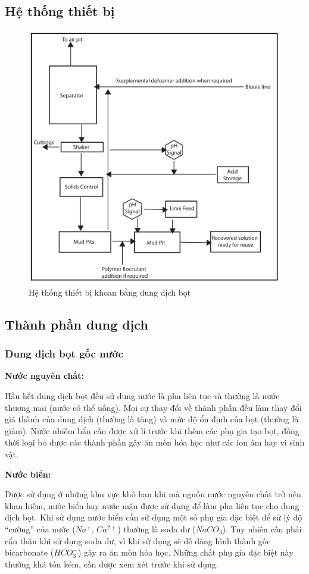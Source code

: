 \documentclass[13pt,a4paper]{article}
\begin{document}
\subsection{Hệ thống thiết bị}
	\begin{figure}[h]
	\centering
	\includegraphics[scale=0.4]{Figs/Fig5.png}
	\caption{Hệ thống thiết bị khoan bằng dung dịch bọt}
	\end{figure}
\subsection{Thành phần dung dịch}
	\subsubsection{Dung dịch bọt gốc nước}
	\textbf{Nước nguyên chất:}\par
	Hầu hết dung dịch bọt đều sử dụng nước là pha liên tục và thường là nước thương mại (nước có thể uống). Mọi sự thay đổi về thành phần đều làm thay đổi giá thành của dung dịch (thường là tăng) và mức độ ổn định của bọt (thường là giảm). Nước nhiễm bẩn cần được xử lí trước khi thêm các phụ gia tạo bọt, đồng thời loại bỏ được các thành phần gây ăn mòn hóa học như các ion âm hay vi sinh vật.\par
	\textbf{Nước biển:}\par
	Được sử dụng ở những khu vực khô hạn khi mà nguồn nước nguyên chất trở nên khan hiếm, nước biển hay nước mặn được sử dụng để làm pha liên tục cho dung dịch bọt. Khi sử dụng nước biển cần sử dụng một số phụ gia đặc biệt để sử lý độ “cường” của nước ($Na^+$, $Ca^{2+}$) thường là soda dư ($NaCO_3$). Tuy nhiên cần phải cẩn thận khi sử dụng soda dư, vì khi sử dụng sẽ dễ dàng hình thành gốc bicarbonate ($HCO_3^-$) gây ra ăn mòn hóa học. Những chất phụ gia đặc biệt này thường khá tốn kém, cần được xem xét trước khi sử dụng.
\end{document}
